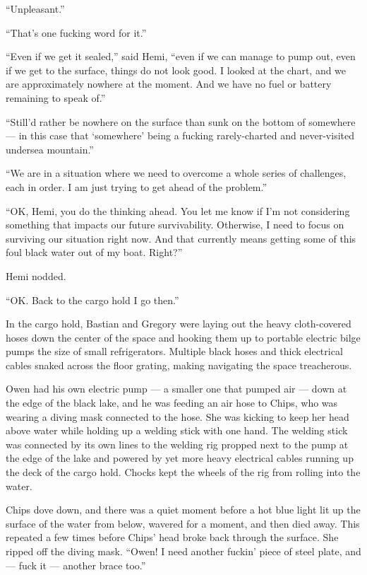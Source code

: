 \documentclass[
]{scrbook}
\begin{document}
``Unpleasant.''

``That's one fucking word for it.''

``Even if we get it sealed,'' said Hemi, ``even if we can manage to pump
out, even if we get to the surface, things do not look good. I looked at
the chart, and we are approximately nowhere at the moment. And we have
no fuel or battery remaining to speak of.''

``Still'd rather be nowhere on the surface than sunk on the bottom of
somewhere --- in this case that `somewhere' being a fucking
rarely-charted and never-visited undersea mountain.''

``We are in a situation where we need to overcome a whole series of
challenges, each in order. I am just trying to get ahead of the
problem.''

``OK, Hemi, you do the thinking ahead. You let me know if I'm not
considering something that impacts our future survivability. Otherwise,
I need to focus on surviving our situation right now. And that currently
means getting some of this foul black water out of my boat. Right?''

Hemi nodded.

``OK. Back to the cargo hold I go then.''

\bigskip

In the cargo hold, Bastian and Gregory were laying out the heavy
cloth-covered hoses down the center of the space and hooking them up to
portable electric bilge pumps the size of small refrigerators. Multiple
black hoses and thick electrical cables snaked across the floor grating,
making navigating the space treacherous.

Owen had his own electric pump --- a smaller one that pumped air ---
down at the edge of the black lake, and he was feeding an air hose to
Chips, who was wearing a diving mask connected to the hose. She was
kicking to keep her head above water while holding up a welding stick
with one hand. The welding stick was connected by its own lines to the
welding rig propped next to the pump at the edge of the lake and powered
by yet more heavy electrical cables running up the deck of the cargo
hold. Chocks kept the wheels of the rig from rolling into the water.

Chips dove down, and there was a quiet moment before a hot blue light
lit up the surface of the water from below, wavered for a moment, and
then died away. This repeated a few times before Chips' head broke back
through the surface. She ripped off the diving mask. ``Owen! I need
another fuckin' piece of steel plate, and --- fuck it --- another brace
too.''
\end{document}
